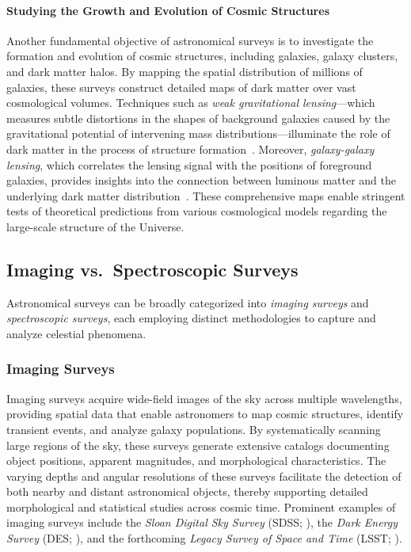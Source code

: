 \paragraph{Studying the Growth and Evolution of Cosmic Structures}
Another fundamental objective of astronomical surveys is to investigate the formation and evolution of cosmic structures, including galaxies, galaxy clusters, and dark matter halos. By mapping the spatial distribution of millions of galaxies, these surveys construct detailed maps of dark matter over vast cosmological volumes. Techniques such as \emph{weak gravitational lensing}—which measures subtle distortions in the shapes of background galaxies caused by the gravitational potential of intervening mass distributions—illuminate the role of dark matter in the process of structure formation~\cite{Bartelmann2001}. Moreover, \emph{galaxy-galaxy lensing}, which correlates the lensing signal with the positions of foreground galaxies, provides insights into the connection between luminous matter and the underlying dark matter distribution~\cite{Mandelbaum2017}. These comprehensive maps enable stringent tests of theoretical predictions from various cosmological models regarding the large-scale structure of the Universe.

\subsection{Imaging vs.\ Spectroscopic Surveys}
Astronomical surveys can be broadly categorized into \emph{imaging surveys} and \emph{spectroscopic surveys}, each employing distinct methodologies to capture and analyze celestial phenomena.

\subsubsection{Imaging Surveys}
Imaging surveys acquire wide-field images of the sky across multiple wavelengths, providing spatial data that enable astronomers to map cosmic structures, identify transient events, and analyze galaxy populations. By systematically scanning large regions of the sky, these surveys generate extensive catalogs documenting object positions, apparent magnitudes, and morphological characteristics. The varying depths and angular resolutions of these surveys facilitate the detection of both nearby and distant astronomical objects, thereby supporting detailed morphological and statistical studies across cosmic time. Prominent examples of imaging surveys include the \textit{Sloan Digital Sky Survey} (SDSS; \citealt{2019BAAS...51g.274K}), the \textit{Dark Energy Survey} (DES; \citealt{2018ApJS..239...18A}), and the forthcoming \textit{Legacy Survey of Space and Time} (LSST; \citealt{2019ApJ...873..111I}).

